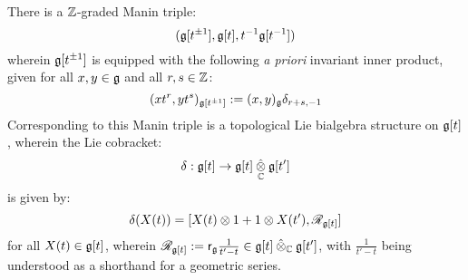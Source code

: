         \begin{proposition} \label{prop: the_yangian_manin_triple}
            There is a $\mathbb{Z}$-graded Manin triple:
                $$( \mathfrak{g}[t^{\pm 1}], \mathfrak{g}[t], t^{-1}\mathfrak{g}[t^{-1}] )$$
            wherein $\mathfrak{g}[t^{\pm 1}]$ is equipped with the following \textit{a priori} invariant inner product, given for all $x, y \in \mathfrak{g}$ and all $r, s \in \mathbb{Z}$:
                $$(x t^r, y t^s)_{\mathfrak{g}[t^{\pm 1}]} := (x, y)_{\mathfrak{g}} \delta_{r + s, -1}$$
            Corresponding to this Manin triple is a topological Lie bialgebra structure on $\mathfrak{g}[t]$, wherein the Lie cobracket:
                $$\delta: \g[t] \to \g[t] \hattensor_{\bbC} \g[t']$$
            is given by:
                $$\delta(X(t)) = [ X(t) \tensor 1 + 1 \tensor X(t'), \scrR_{\g[t]} ]$$
            for all $X(t) \in \mathfrak{g}[t]$, wherein $\scrR_{\g[t]} := \sfr_{\g} \frac{1}{t' - t} \in \g[t] \hattensor_{\bbC} \g[t']$, with $\frac{1}{t' - t}$ being understood as a shorthand for a geometric series.
        \end{proposition}

